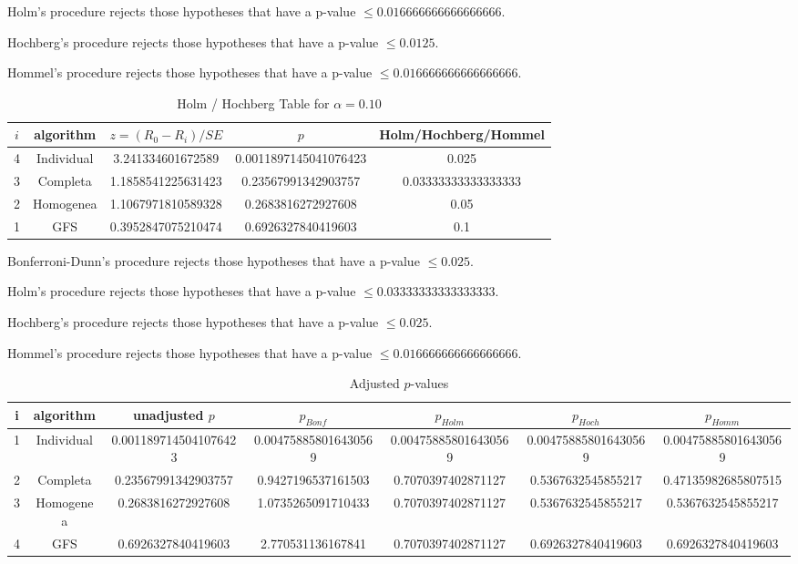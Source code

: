 \documentclass[a4paper,10pt]{article}
\begin{document}
\begin{landscape}
Holm's procedure rejects those hypotheses that have a p-value $\le0.016666666666666666$.


Hochberg's procedure rejects those hypotheses that have a p-value $\le0.0125$.


Hommel's procedure rejects those hypotheses that have a p-value $\le0.016666666666666666$.


\begin{table}[!htp]
\centering\tiny
\caption{Holm / Hochberg Table for $\alpha=0.10$}
\begin{tabular}{ccccc}
$i$&algorithm&$z=(R_0 - R_i)/SE$&$p$&Holm/Hochberg/Hommel\\
\hline
4&Individual&3.241334601672589&0.0011897145041076423&0.025\\
3&Completa&1.1858541225631423&0.23567991342903757&0.03333333333333333\\
2&Homogenea&1.1067971810589328&0.2683816272927608&0.05\\
1&GFS&0.3952847075210474&0.6926327840419603&0.1\\
\hline
\end{tabular}
\end{table}
Bonferroni-Dunn's procedure rejects those hypotheses that have a p-value $\le0.025$.


Holm's procedure rejects those hypotheses that have a p-value $\le0.03333333333333333$.


Hochberg's procedure rejects those hypotheses that have a p-value $\le0.025$.


Hommel's procedure rejects those hypotheses that have a p-value $\le0.016666666666666666$.


\begin{table}[!htp]
\centering\tiny
\caption{Adjusted $p$-values}
\begin{tabular}{ccccccc}
i&algorithm&unadjusted $p$&$p_{Bonf}$&$p_{Holm}$&$p_{Hoch}$&$p_{Homm}$\\
\hline
1&Individual&0.0011897145041076423&0.004758858016430569&0.004758858016430569&0.004758858016430569&0.004758858016430569\\
2&Completa&0.23567991342903757&0.9427196537161503&0.7070397402871127&0.5367632545855217&0.47135982685807515\\
3&Homogenea&0.2683816272927608&1.0735265091710433&0.7070397402871127&0.5367632545855217&0.5367632545855217\\
4&GFS&0.6926327840419603&2.770531136167841&0.7070397402871127&0.6926327840419603&0.6926327840419603\\
\hline
\end{tabular}
\end{table}


\end{landscape}
\end{document}

